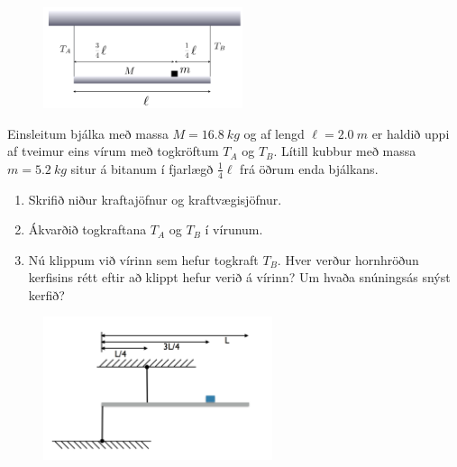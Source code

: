 \begin{enumerate}[label = \textbf{Dæmi \thechapter.\arabic*.}]
\vspace{0.5cm}

\begin{minipage}{\linewidth}
\begin{figure}
\vspace{-0.25cm}
\includegraphics[width=2.3in]{images/bjalkens.png}
\end{figure}

\item Einsleitum bjálka með massa $M = \SI{16.8}{kg}$ og af lengd $\ell = \SI{2.0}{m}$ er haldið uppi af tveimur eins vírum með togkröftum $T_A$ og $T_B$. Lítill kubbur með massa $m = \SI{5.2}{kg}$ situr á bitanum í fjarlægð $\frac{1}{4}\ell$ frá öðrum enda bjálkans. 
\end{minipage}
\vspace{0.1cm}
\begin{enumerate}[label = \textbf{(\alph*)}]
    \item Skrifið niður kraftajöfnur og kraftvægisjöfnur.
    \item Ákvarðið togkraftana $T_A$ og $T_B$ í vírunum.
    \item Nú klippum við vírinn sem hefur togkraft $T_B$. Hver verður hornhröðun \\ kerfisins rétt eftir að klippt hefur verið á vírinn? Um hvaða snúningsás snýst kerfið?
\end{enumerate}

\vspace{0.5cm}

\begin{minipage}{\linewidth}

\begin{figure}
\vspace{-0.5cm}
\includegraphics[width=2.65in]{images/jafnvaegi.png}
\end{figure}


\end{minipage}
\end{enumerate}
